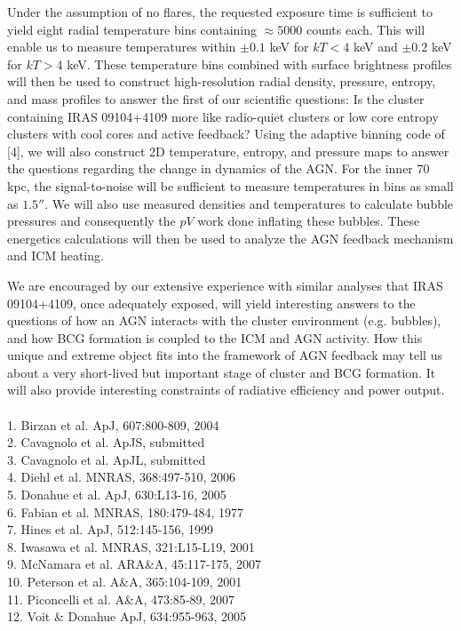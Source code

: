 \documentclass[letterpaper,11pt,twocolumn]{article}
\begin{document}
Under the assumption of no flares, the requested exposure time is
sufficient to yield eight radial temperature bins containing $\approx
5000$ counts each. This will enable us to measure temperatures within
$\pm0.1$ keV for $kT < 4$ keV and $\pm0.2$ keV for $kT > 4$ keV. These
temperature bins combined with surface brightness profiles will then
be used to construct high-resolution radial density, pressure,
entropy, and mass profiles to answer the first of our
scientific questions: Is the cluster containing IRAS 09104+4109 more
like radio-quiet clusters or low core entropy clusters with cool cores
and active feedback?
Using the adaptive binning code of [4], we
will also construct 2D temperature, entropy, and pressure maps to
answer the questions regarding the change in dynamics of the AGN. For
the inner 70 kpc, the signal-to-noise will be sufficient to measure
temperatures in bins as small as $1.5''$. We will also use measured
densities and temperatures to calculate bubble pressures and
consequently the $pV$ work done inflating these bubbles. These
energetics calculations will then be used to analyze the AGN feedback
mechanism and ICM heating.

We are encouraged by our extensive experience with similar analyses
that IRAS 09104+4109, once adequately exposed, will yield interesting
answers to the questions of how an AGN interacts with the
cluster environment (e.g. bubbles), and how BCG formation is coupled
to the ICM and AGN activity. How this unique and extreme object fits
into the framework of AGN feedback may tell us about a very
short-lived but important stage of cluster and BCG formation. It
will also provide interesting constraints of radiative efficiency and
power output.\\

\\
1. Birzan et al. ApJ, 607:800-809, 2004\\
2. Cavagnolo et al. ApJS, submitted\\
3. Cavagnolo et al. ApJL, submitted\\
4. Diehl et al. MNRAS, 368:497-510, 2006\\
5. Donahue et al. ApJ, 630:L13-16, 2005\\
6. Fabian et al. MNRAS, 180:479-484, 1977\\
7. Hines et al. ApJ, 512:145-156, 1999\\
8. Iwasawa et al. MNRAS, 321:L15-L19, 2001\\
9. McNamara et al. ARA\&A, 45:117-175, 2007\\
10. Peterson et al. A\&A, 365:104-109, 2001\\
11. Piconcelli et al. A\&A, 473:85-89, 2007\\
12. Voit \& Donahue ApJ, 634:955-963, 2005\\
\end{document}
